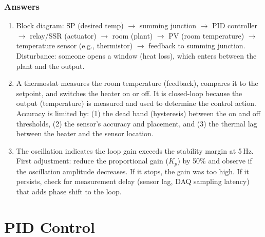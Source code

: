 \documentclass[11pt,letterpaper,twoside,openany]{book}
\begin{document}
\subsection{Answers}
\begin{enumerate}[leftmargin=1.5em]
\item Block diagram: SP (desired temp) $\to$ summing junction $\to$ PID controller $\to$ relay/SSR (actuator) $\to$ room (plant) $\to$ PV (room temperature) $\to$ temperature sensor (e.g., thermistor) $\to$ feedback to summing junction. Disturbance: someone opens a window (heat loss), which enters between the plant and the output.
\item A thermostat measures the room temperature (feedback), compares it to the setpoint, and switches the heater on or off. It is closed-loop because the output (temperature) is measured and used to determine the control action. Accuracy is limited by: (1) the dead band (hysteresis) between the on and off thresholds, (2) the sensor's accuracy and placement, and (3) the thermal lag between the heater and the sensor location.
\item The oscillation indicates the loop gain exceeds the stability margin at 5\,Hz. First adjustment: reduce the proportional gain ($K_p$) by 50\% and observe if the oscillation amplitude decreases. If it stops, the gain was too high. If it persists, check for measurement delay (sensor lag, DAQ sampling latency) that adds phase shift to the loop.
\end{enumerate}


\chapter{PID Control}
\label{ch:pid}
\end{document}
